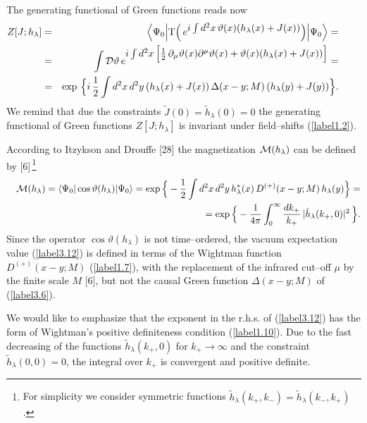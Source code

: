 \documentclass[a4paper,12pt] {article}
\begin{document}
The generating functional of Green functions reads now
%
\begin{eqnarray}\label{label3.11}
\hspace{-0.3in}Z[J;h_{\lambda}] &=& \Big\langle \Psi_0\Big|{\rm
T}\Big(\,e^{\textstyle i\int d^2x\,\vartheta(x)(h_{\lambda}(x) +
J(x))}\Big)\Big|\Psi_0\Big\rangle =\nonumber\\ 
\hspace{-0.3in}&=&\int {\cal D}\vartheta\,e^{\textstyle i\int
d^2x\,\Big[\frac{1}{2}\,\partial_{\mu}\vartheta(x)\partial^{\mu}
\vartheta(x) + \vartheta(x)(h_{\lambda}(x) + J(x))\Big]} = \nonumber\\
\hspace{-0.3in}&=& \exp\,\Big\{i\,\frac{1}{2}\int
d^2x\,d^2y\,(h_{\lambda}(x) + J(x))\,\Delta(x-y; M)\,(h_{\lambda}(y) +
J(y))\Big\}.
\end{eqnarray}
%
We remind that due the constraints $\tilde{J}(0) =
\tilde{h}_{\lambda}(0) = 0$ the generating functional of Green
functions $Z[J;h_{\lambda}]$ is invariant under field--shifts (\ref{label1.2}).

According to Itzykson and Drouffe [28] the magnetization ${\cal
M}(h_{\lambda})$ can be defined by [6]\,\footnote{For simplicity we
consider symmetric functions $\tilde{h}_{\lambda}(k_+,k_-) =
\tilde{h}_{\lambda}(k_-,k_+)$.}
%
\begin{eqnarray}\label{label3.12}
&&{\cal M}(h_{\lambda}) = \langle
\Psi_0|\cos\vartheta(h_{\lambda})|\Psi_0\rangle = \exp \Big\{ -
\frac{1}{2}\int d^2x\,d^2y\,h^*_{\lambda}(x)\,D^{(+)}(x-y;
M)\,h_{\lambda}(y)\Big\} = \nonumber\\ &&= \exp \Big\{ -
\frac{1}{4\pi}\int^{\infty}_0\frac{dk_+}{k_+}\,
|\tilde{h}_{\lambda}(k_+, 0)|^2\,\Big\}.
\end{eqnarray}
%
Since the operator $\cos\vartheta(h_{\lambda})$ is not time--ordered,
the vacuum expectation value (\ref{label3.12}) is defined in terms of
the Wightman function $D^{(+)}(x-y; M)$ (\ref{label1.7}), with the
replacement of the infrared cut--off $\mu$ by the finite scale $M$
[6], but not the causal Green function $\Delta(x-y; M)$ of
(\ref{label3.6}).

We would like to emphasize that the exponent in the r.h.s. of
(\ref{label3.12}) has the form of Wightman's positive definiteness
condition (\ref{label1.10}). Due to the fast decreasing of the
functions $\tilde{h}_{\lambda}(k_+,0)$ for $k_+ \to \infty$ and the
constraint $\tilde{h}_{\lambda}(0,0) = 0$, the integral over $k_+$ is
convergent and positive definite.
\end{document}
